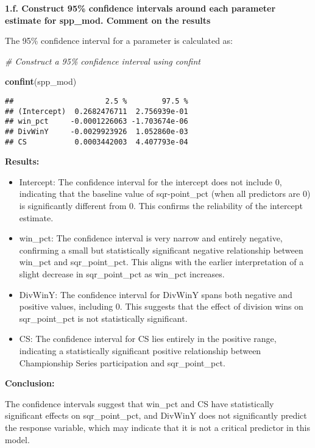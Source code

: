 \documentclass[
]{article}
\newenvironment{Shaded}{\begin{snugshade}}{\end{snugshade}}
\newcommand{\CommentTok}[1]{\textcolor[rgb]{0.56,0.35,0.01}{\textit{#1}}}
\newcommand{\FunctionTok}[1]{\textcolor[rgb]{0.13,0.29,0.53}{\textbf{#1}}}
\newcommand{\NormalTok}[1]{#1}
\begin{document}
\textbf{1.f. Construct 95\% confidence intervals around each parameter
estimate for spp\_mod. Comment on the results}

The 95\% confidence interval for a parameter is calculated as:

\begin{Shaded}
\begin{Highlighting}[]
\CommentTok{\# Construct a 95\% confidence interval using confint}

\FunctionTok{confint}\NormalTok{(spp\_mod)}
\end{Highlighting}
\end{Shaded}

\begin{verbatim}
##                     2.5 %        97.5 %
## (Intercept)  0.2682476711  2.756939e-01
## win_pct     -0.0001226063 -1.703674e-06
## DivWinY     -0.0029923926  1.052860e-03
## CS           0.0003442003  4.407793e-04
\end{verbatim}

\textbf{Results:}

\begin{itemize}
\item
  Intercept: The confidence interval for the intercept does not include
  0, indicating that the baseline value of sqr-point\_pct (when all
  predictors are 0) is significantly different from 0. This confirms the
  reliability of the intercept estimate.
\item
  win\_pct: The confidence interval is very narrow and entirely
  negative, confirming a small but statistically significant negative
  relationship between win\_pct and sqr\_point\_pct. This aligns with
  the earlier interpretation of a slight decrease in sqr\_point\_pct as
  win\_pct increases.
\item
  DivWinY: The confidence interval for DivWinY spans both negative and
  positive values, including 0. This suggests that the effect of
  division wins on sqr\_point\_pct is not statistically significant.
\item
  CS: The confidence interval for CS lies entirely in the positive
  range, indicating a statistically significant positive relationship
  between Championship Series participation and sqr\_point\_pct.
\end{itemize}

\textbf{Conclusion:}

The confidence intervals suggest that win\_pct and CS have statistically
significant effects on sqr\_point\_pct, and DivWinY does not
significantly predict the response variable, which may indicate that it
is not a critical predictor in this model.
\end{document}
